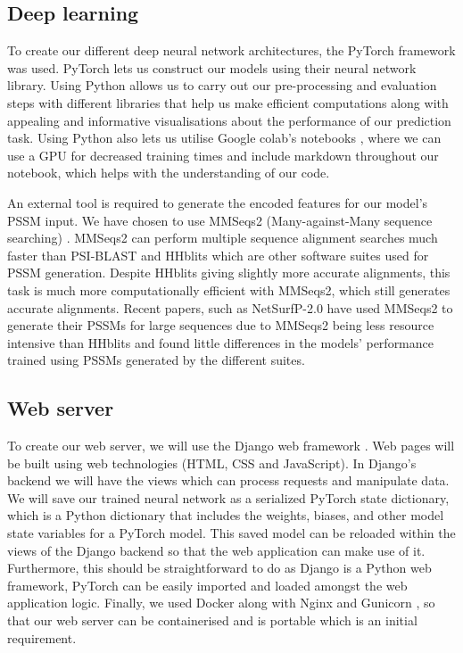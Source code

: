 \documentclass{l4proj}
\begin{document}
\subsection{Deep learning}

To create our different deep neural network architectures, the PyTorch framework \citep{pytorch} was used. PyTorch lets us construct our models using their neural network library. Using Python allows us to carry out our pre-processing and evaluation steps with different libraries that help us make efficient computations along with appealing and informative visualisations about the performance of our prediction task. Using Python also lets us utilise Google colab’s notebooks \citep{Bisong:19}, where we can use a GPU for decreased training times and include markdown throughout our notebook, which helps with the understanding of our code.

An external tool is required to generate the encoded features for our model's PSSM input. We have chosen to use MMSeqs2 (Many-against-Many sequence searching) \citep{Steinegger:17}. MMSeqs2 can perform multiple sequence alignment searches much faster than PSI-BLAST \citep{Altschul:97} and HHblits \citep{Remmert:12} which are other software suites used for PSSM generation. Despite HHblits giving slightly more accurate alignments, this task is much more computationally efficient with MMSeqs2, which still generates accurate alignments. Recent papers, such as NetSurfP-2.0 \citep{Klausen:19} have used MMSeqs2 to generate their PSSMs for large sequences due to MMSeqs2 being less resource intensive than HHblits and found little differences in the models' performance trained using PSSMs generated by the different suites.

\subsection{Web server}

To create our web server, we will use the Django web framework \citep{Django:05}. Web pages will be built using web technologies (HTML, CSS and JavaScript). In Django’s backend we will have the views which can process requests and manipulate data. We will save our trained neural network as a serialized PyTorch state dictionary, which is a Python dictionary that includes the weights, biases, and other model state variables for a PyTorch model. This saved model can be reloaded within the views of the Django backend so that the web application can make use of it. Furthermore, this should be straightforward to do as Django is a Python web framework, PyTorch can be easily imported and loaded amongst the web application logic. Finally, we used Docker \citep{Docker:14} along with Nginx \citep{Reese:08} and Gunicorn \citep{gunicorn:wiki}, so that our web server can be containerised and is portable which is an initial requirement. 
\end{document}
